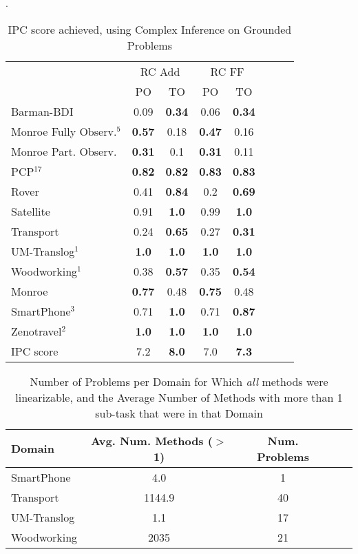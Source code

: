 \documentclass[letterpaper]{article} %
\begin{document}
\begin{table}
	\centering
	\caption{IPC score achieved, using Complex Inference on Grounded Problems}
	\label{table:GroundedComplexIPC}.
	\scalebox{0.8} { 
\begin{tabular}{lccccccl} 
			\toprule 
		& \multicolumn{2}{c}{ RC Add} & \multicolumn{2}{c}{ RC FF} \\ %
		\cmidrule(lr){2-3} \cmidrule(lr){4-5}  
	&PO & TO  &PO & TO  \\ 
	\midrule 
	Barman-BDI & 0.09 & \textbf{0.34} & 0.06 & \textbf{0.34}  \\ 

	Monroe Fully Observ.$^{5}$ & \textbf{0.57} & 0.18 & \textbf{0.47} & 0.16  \\ 
	Monroe Part. Observ. & \textbf{0.31} & 0.1 & \textbf{0.31} & 0.11  \\ 
	PCP$^{17}$ & \textbf{0.82} & \textbf{0.82} & \textbf{0.83} & \textbf{0.83}  \\ 
	Rover & 0.41 & \textbf{0.84} & 0.2 & \textbf{0.69}  \\ 
	Satellite & 0.91 & \textbf{1.0} & 0.99 & \textbf{1.0}  \\ 
	Transport & 0.24 & \textbf{0.65} & 0.27 & \textbf{0.31}  \\ 
	UM-Translog$^{1}$ & \textbf{1.0} & \textbf{1.0} & \textbf{1.0} & \textbf{1.0}  \\ 
	Woodworking$^{1}$ & 0.38 & \textbf{0.57} & 0.35 & \textbf{0.54}  \\ 
	\midrule 
	Monroe & \textbf{0.77} & 0.48 & \textbf{0.75} & 0.48  \\ 
	SmartPhone$^{3}$ & 0.71 & \textbf{1.0} & 0.71 & \textbf{0.87}  \\ 
	Zenotravel$^{2}$ & \textbf{1.0} & \textbf{1.0} & \textbf{1.0} & \textbf{1.0}  \\ 
		\midrule 
	IPC score & 7.2 & \textbf{8.0} & 7.0 & \textbf{7.3}  \\ 
	\bottomrule 
\end{tabular}  
	}
\end{table}


\begin{table} 
	\centering  
	\caption{Number of Problems per Domain for Which \emph{all} methods were linearizable, and the Average Number of Methods with more than 1 sub-task that were in that Domain}
	\scalebox{0.75} { 
	\begin{tabular}{lcccl} 
		\toprule
		Domain      & Avg. Num. Methods ($>$ 1) & Num. Problems \\
		\midrule
		SmartPhone  & 4.0                   &  1     \\
		Transport   & 1144.9                & 40       \\
		UM-Translog & 1.1                    & 17   \\
		Woodworking & 2035              &   21    \\
				\bottomrule 
	\end{tabular} 
	}
\end{table}
\end{document}
